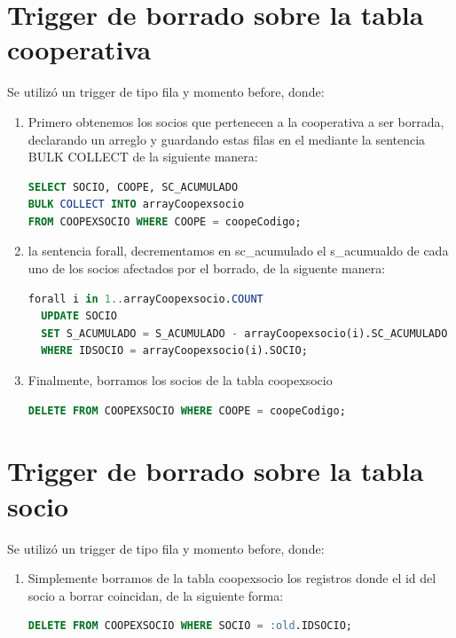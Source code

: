\documentclass{article}
\begin{document}
\section{Trigger de borrado sobre la tabla cooperativa}\label{sec:trigger-de-borrado-sobre-la-tabla-cooperativa}

Se utilizó un trigger de tipo fila y momento before, donde:
    \begin{enumerate}
    \begin{enumerate}[4.1]
        \item Primero obtenemos los socios que pertenecen a la cooperativa a ser borrada, declarando un arreglo y guardando estas filas en el mediante la sentencia BULK COLLECT de la siguiente manera:
 \begin{lstlisting}[language=SQL,label={lst:lstlisting6}]
SELECT SOCIO, COOPE, SC_ACUMULADO
BULK COLLECT INTO arrayCoopexsocio
FROM COOPEXSOCIO WHERE COOPE = coopeCodigo;   \end{lstlisting}

    \item la sentencia forall, decrementamos en sc\_acumulado  el s\_acumualdo de cada uno de los socios afectados por el borrado, de la siguente manera:
\begin{lstlisting}[language=SQL,label={lst:lstlisting7}]
forall i in 1..arrayCoopexsocio.COUNT
  UPDATE SOCIO
  SET S_ACUMULADO = S_ACUMULADO - arrayCoopexsocio(i).SC_ACUMULADO
  WHERE IDSOCIO = arrayCoopexsocio(i).SOCIO;\end{lstlisting}

  \item Finalmente, borramos los socios de la tabla coopexsocio

\begin{lstlisting}[language=SQL,label={lst:lstlisting8}]
DELETE FROM COOPEXSOCIO WHERE COOPE = coopeCodigo;    \end{lstlisting}
    \end{enumerate}
    \end{enumerate}

\section{Trigger de borrado sobre la tabla socio}\label{sec:trigger-de-borrado-sobre-la-tabla-socio}

Se utilizó un trigger de tipo fila y momento before, donde:
    \begin{enumerate}
    \begin{enumerate}[5.1]
        \item Simplemente borramos de la tabla coopexsocio los registros donde el id del socio a borrar coincidan, de la siguiente forma:

\begin{lstlisting}[language=SQL,label={lst:lstlisting9}]
DELETE FROM COOPEXSOCIO WHERE SOCIO = :old.IDSOCIO;    \end{lstlisting}
    \end{enumerate}
    \end{enumerate}
\end{document}
